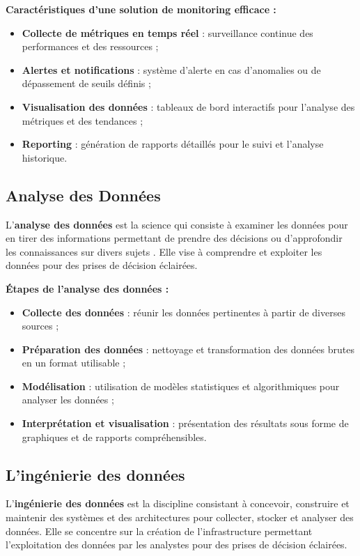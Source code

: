     \textbf{Caractéristiques d'une solution de monitoring efficace :}
    \begin{itemize}
        \item \textbf{Collecte de métriques en temps réel} : surveillance continue des performances et des ressources ;
        \item \textbf{Alertes et notifications} : système d'alerte en cas d'anomalies ou de dépassement de seuils définis ;
        \item \textbf{Visualisation des données} : tableaux de bord interactifs pour l'analyse des métriques et des tendances ;
        \item \textbf{Reporting} : génération de rapports détaillés pour le suivi et l'analyse historique.
    \end{itemize}
    
    \subsection{Analyse des Données}
    
    L'\textbf{analyse des données} est la science qui consiste à examiner les données pour en tirer des informations permettant 
    de prendre des décisions ou d'approfondir les connaissances sur divers sujets \cite{analyse}.
     Elle vise à comprendre et exploiter les données pour des prises de décision éclairées.
    
    \textbf{Étapes de l'analyse des données :}
    \begin{itemize}
        \item \textbf{Collecte des données} : réunir les données pertinentes à partir de diverses sources ;
        \item \textbf{Préparation des données} : nettoyage et transformation des données brutes en un format utilisable ;
        \item \textbf{Modélisation} : utilisation de modèles statistiques et algorithmiques pour analyser les données ;
        \item \textbf{Interprétation et visualisation} : présentation des résultats sous forme de graphiques et de rapports compréhensibles.
    \end{itemize}
    
    \subsection{L'ingénierie des données}
    
    L'\textbf{ingénierie des données} est la discipline consistant à concevoir, construire et maintenir des systèmes et des architectures 
    pour collecter, stocker et analyser des données. 
    Elle se concentre sur la création de l'infrastructure permettant l'exploitation des données par les analystes pour des prises de décision éclairées.
    
